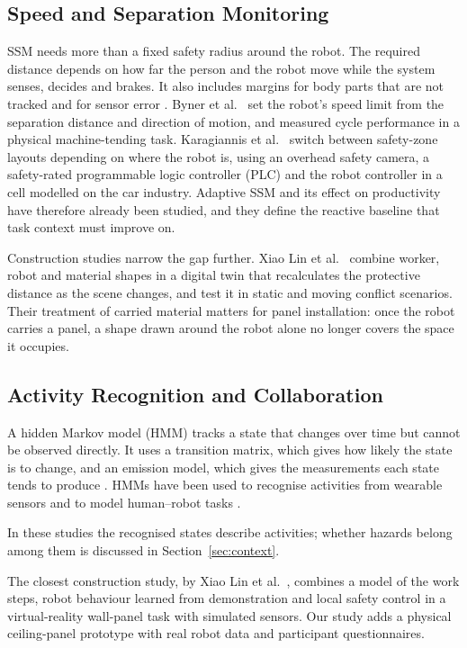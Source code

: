 \documentclass{IEEEtran}
\begin{document}
\subsection{Speed and Separation Monitoring}
SSM needs more than a fixed safety radius around the robot. The required
distance depends on how far the person and the robot move while the system
senses, decides and brakes. It also includes margins for body parts that are
not tracked and for sensor error \cite{marvel2017implementing,iso15066}.
Byner et al.\ \cite{byner2019dynamic} set the robot's speed limit from the
separation distance and direction of motion, and measured cycle performance in
a physical machine-tending task. Karagiannis et al.\
\cite{karagiannis2022adaptive} switch between safety-zone layouts depending on
where the robot is, using an overhead safety camera, a safety-rated
programmable logic controller (PLC) and the robot controller in a cell modelled
on the car industry. Adaptive SSM and its effect on productivity have therefore already been
studied, and they define the reactive baseline that task context must improve
on.

Construction studies narrow the gap further. Xiao Lin et al.\
\cite{lin2025digitaltwin} combine worker, robot and material shapes in a digital
twin that recalculates the protective distance as the scene changes, and test
it in static and moving conflict scenarios. Their treatment of carried material
matters for panel installation: once the robot carries a panel, a shape drawn
around the robot alone no longer covers the space it occupies.

\subsection{Activity Recognition and Collaboration}
A hidden Markov model (HMM) tracks a state that changes over time but cannot be
observed directly. It uses a transition matrix, which gives how likely the
state is to change, and an emission model, which gives the measurements each
state tends to produce \cite{rabiner1989}. HMMs have been used to recognise
activities from wearable sensors and to model human--robot tasks
\cite{manouchehri2023hmm,berg2018assembly}.

In these studies the recognised states describe activities; whether hazards
belong among them is discussed in Section~\ref{sec:context}.

The closest construction study, by Xiao Lin et al.\ \cite{lin2026semantic},
combines a model of the work steps, robot behaviour learned from demonstration
and local safety control in a virtual-reality wall-panel task with simulated
sensors. Our study adds a physical ceiling-panel prototype with real robot
data and participant questionnaires.
\end{document}
